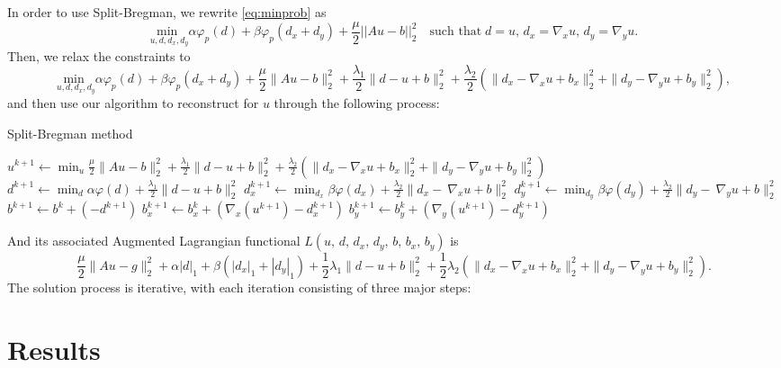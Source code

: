 \documentclass[english]{article}\usepackage[]{graphicx}\usepackage[]{color}
\begin{document}
In order to use Split-Bregman, we rewrite \ref{eq:minprob} as
\begin{equation}
\underset{u,d,d_{x},d_{y}}{{\text{{min }}}}\alpha\varphi_p\left(d\right)+\beta\varphi_p\left(d_x + d_y\right)+\frac{\mu}{2}||Au-b||_2^2\quad\text{such that}\; d=u,\, d_{x}=\nabla_{x}u,\, d_{y}=\nabla_{y}u.
\label{eq:sbprob}\end{equation}
Then, we relax the constraints to
\[
\underset{u,d,d_{x},d_{y}}{{\text{{min }}}}\alpha\varphi_p\left(d\right)+\beta\varphi_p\left(d_x +
 d_y\right)+\frac{\mu}{2}\|Au-b\|_2^2 + \frac{\lambda_1}{2}\|d-u+b\|_{2}^{2}+\frac{\lambda_2}{2}\left(\|d_{x}-\nabla_{x}u+b_{x}\|_{2}^{2}+\|d_{y}-\nabla_{y}u+b_{y}\|_{2}^{2}\right),
\]
and then use our algorithm to reconstruct for $u$ through the following process:

\begin{algorithm}
\caption{Split-Bregman method}\label{split-bregman}
\begin{algorithmic}[1]
\State $u^{k+1}\gets \min_u{\frac{\mu}{2}\|Au-b\|_2^2+\frac{\lambda_1}{2}\|d-u+b\|_{2}^{2}+\frac{\lambda_2}{2}\left(\|d_{x}-\nabla_{x}u+b_{x}\|_{2}^{2}+\|d_{y}-\nabla_{y}u+b_{y}\|_{2}^{2}\right)}$
\State $d^{k+1}\gets \min_d{\alpha\varphi(d)+\frac{\lambda_1}{2}\|d-u+b\|_2^2}$
\State $d_x^{k+1}\gets \min_{d_x}{\beta\varphi(d_x)+\frac{\lambda_2}{2}\|d_x-\ \nabla_xu+b\|_2^2}$
\State $d_y^{k+1}\gets \min_{d_y}{\beta\varphi(d_y)+\frac{\lambda_2}{2}\|d_y-\ \nabla_yu+b\|_2^2}$
\EndFor
\State $b^{k+1}\gets b^{k}+\left(-d^{k+1}\right)$
\State $b_x^{k+1}\gets b_x^{k}+\left(\nabla_x \left(u^{k+1}\right) - d_x^{k+1}\right)$
\State $b_y^{k+1}\gets b_y^{k}+\left(\nabla_y \left(u^{k+1}\right) - d_y^{k+1}\right)$
\EndWhile
\EndProcedure
\end{algorithmic}
\end{algorithm}


And its associated Augmented Lagrangian functional $L(u,\, d,\, d_{x},\, d_{y},\, b,\, b_{x},\, b_{y})$ is 
\[\frac{\mu}{2}\|Au-g\|_{2}^{2}+\alpha|d|_{1}+\beta(|d_{x}|_{1}+|d_{y}|_{1})+\frac{1}{2}\lambda_{1}\|d-u+b\|_{2}^{2}+\frac{{1}}{2}\lambda_{2}(\|d_{x}-\nabla_{x}u+b_{x}\|_{2}^{2}+\|d_{y}-\nabla_{y}u+b_{y}\|_{2}^{2}).
\]
The solution process is iterative, with each iteration consisting
of three major steps:


\section{Results}
\end{document}
